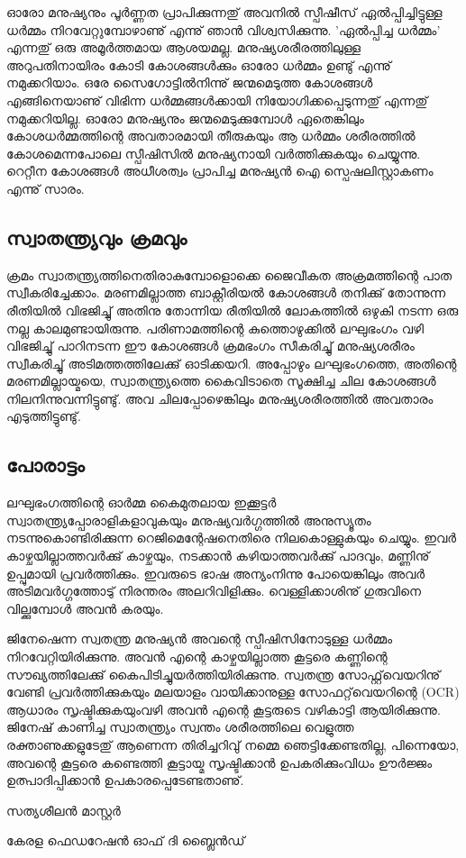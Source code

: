 \newpage
{}
ഓരോ മനുഷ്യനും പൂര്‍ണ്ണത പ്രാപിക്കുന്നതു് അവനില്‍ സ്പീഷീസ് ഏല്‍പ്പിച്ചിട്ടുള്ള ധര്‍മ്മം നിറവേറ്റുമ്പോഴാണു് എന്നു് ഞാന്‍ വിശ്വസിക്കുന്നു. 'ഏല്‍പ്പിച്ച ധര്‍മ്മം' എന്നതു് ഒരു അമൂര്‍ത്തമായ ആശയമല്ല. മനുഷ്യശരീരത്തിലുള്ള അറുപതിനായിരം കോടി കോശങ്ങള്‍ക്കും ഓരോ ധര്‍മ്മം ഉണ്ടു് എന്നു് നമുക്കറിയാം. ഒരേ സൈഗോട്ടില്‍നിന്നു് ജന്മമെടുത്ത  കോശങ്ങള്‍ എങ്ങിനെയാണു് വിഭിന്ന ധര്‍മ്മങ്ങള്‍ക്കായി നിയോഗിക്കപ്പെടുന്നതു് എന്നതു് നമുക്കറിയില്ല. ഓരോ മനുഷ്യനും ജന്മമെടുക്കുമ്പോള്‍ ഏതെങ്കിലും കോശധര്‍മ്മത്തിന്റെ അവതാരമായി തീരുകയും ആ ധര്‍മ്മം ശരീരത്തില്‍ കോശമെന്നപോലെ സ്പീഷിസില്‍ മനുഷ്യനായി
വര്‍ത്തിക്കുകയും ചെയ്യുന്നു. റെറ്റീന കോശങ്ങള്‍ അധീശത്വം പ്രാപിച്ച മനുഷ്യന്‍ ഐ സ്പെഷലിസ്റ്റാകണം എന്നു് സാരം.

\subsection*{സ്വാതന്ത്ര്യവും ക്രമവും}
ക്രമം സ്വാതന്ത്ര്യത്തിനെതിരാകുമ്പോളൊക്കെ ജൈവീകത അക്രമത്തിന്റെ പാത സ്വീകരിച്ചേക്കാം. മരണമില്ലാത്ത ബാക്റ്റീരിയല്‍ കോശങ്ങള്‍ തനിക്കു് തോന്നുന്ന രീതിയില്‍ വിഭജിച്ചു് അതിനു തോന്നിയ രീതിയില്‍ ലോകത്തില്‍ ഒഴുകി നടന്ന ഒരു നല്ല കാലമുണ്ടായിരുന്നു. പരിണാമത്തിന്റെ കുത്തൊഴുക്കില്‍ ലഘുഭംഗം വഴി വിഭജിച്ചു് പാറിനടന്ന ഈ കോശങ്ങള്‍ ക്രമഭംഗം സീകരിച്ചു് മനുഷ്യശരീരം സ്വീകരിച്ചു് അടിമത്തത്തിലേക്കു് ഓടിക്കയറി. അപ്പോഴും ലഘുഭംഗത്തെ, അതിന്റെ മരണമില്ലായ്മയെ, സ്വാതന്ത്ര്യത്തെ കൈവിടാതെ സൂക്ഷിച്ച ചില കോശങ്ങള്‍ നിലനിന്നുവന്നിട്ടുണ്ടു്. അവ ചിലപ്പോഴെങ്കിലും മനുഷ്യശരീരത്തില്‍ അവതാരം എടുത്തിട്ടുണ്ടു്.

\subsection*{പോരാട്ടം}
ലഘുഭംഗത്തിന്റെ ഓര്‍മ്മ കൈമുതലായ ഇക്കൂട്ടര്‍ സ്വാതന്ത്ര്യപ്പോരാളികളാവുകയും മനുഷ്യവര്‍ഗ്ഗത്തില്‍ അനുസ്യൂതം നടന്നുകൊണ്ടിരിക്കുന്ന റെജിമെന്റേഷനെതിരെ നിലകൊള്ളുകയും ചെയ്യും.
ഇവര്‍ കാഴ്ചയില്ലാത്തവര്‍ക്കു് കാഴ്ചയും, നടക്കാന്‍ കഴിയാത്തവര്‍ക്കു് പാദവും, മണ്ണിനു് ഉപ്പുമായി പ്രവര്‍ത്തിക്കും. ഇവരുടെ ഭാഷ അന്യംനിന്നു പോയെങ്കിലും
അവര്‍ അടിമവര്‍ഗ്ഗത്തോടു് നിരന്തരം അലറിവിളിക്കും. വെള്ളിക്കാശിനു് ഗുരുവിനെ വില്ക്കുമ്പോള്‍ അവന്‍ കരയും.

ജിനേഷെന്ന സ്വതന്ത്ര മനുഷ്യന്‍ അവന്റെ സ്പീഷിസിനോടുള്ള ധര്‍മ്മം നിറവേറ്റിയിരിക്കുന്നു. അവന്‍ എന്റെ കാഴ്ചയില്ലാത്ത കൂട്ടരെ കണ്ണിന്റെ സൗഖ്യത്തിലേക്കു് കൈപിടിച്ചുയര്‍ത്തിയിരിക്കുന്നു. സ്വതന്ത്ര സോഫ്റ്റ്‌വെയറിനു് വേണ്ടി പ്രവര്‍ത്തിക്കുകയും മലയാളം വായിക്കാനുള്ള സോഫറ്റ്‌വെയറിന്റെ (OCR) ആധാരം സൃഷ്ടിക്കുകയുംവഴി അവന്‍ എന്റെ കൂട്ടരുടെ വഴികാട്ടി ആയിരിക്കുന്നു.
ജിനേഷ് കാണിച്ച സ്വാതന്ത്ര്യം സ്വന്തം ശരീരത്തിലെ വെളുത്ത രക്താണുക്കളുടേതു് ആണെന്ന തിരിച്ചറിവു് നമ്മെ ഞെട്ടിക്കേണ്ടതില്ല, പിന്നെയോ, അവന്റെ കൂട്ടരെ കണ്ടെത്തി കൂട്ടായ്മ സൃഷ്ടിക്കാന്‍ ഉപകരിക്കുംവിധം ഊര്‍ജ്ജം ഉത്പാദിപ്പിക്കാന്‍ ഉപകാരപ്പെടേണ്ടതാണു്.

\begin{flushright}സത്യശീലന്‍ മാസ്റ്റര്‍

കേരള ഫെഡറേഷന്‍ ഓഫ് ദി ബ്ലൈന്‍ഡ്\end{flushright}
